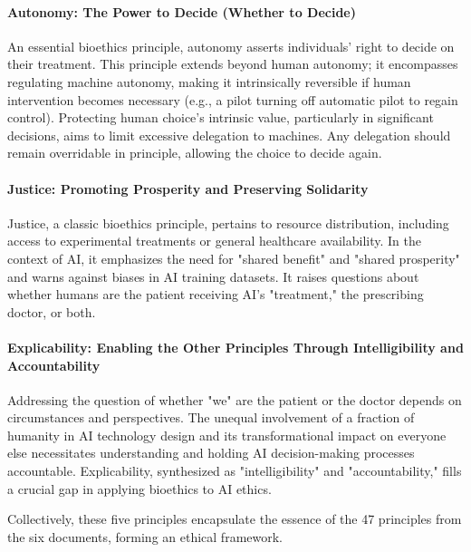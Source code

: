 \paragraph{Autonomy: The Power to Decide (Whether to Decide)}
An essential bioethics principle, autonomy asserts individuals' right to decide on their treatment. This principle extends beyond human autonomy; it encompasses regulating machine autonomy, making it intrinsically reversible if human intervention becomes necessary (e.g., a pilot turning off automatic pilot to regain control). Protecting human choice's intrinsic value, particularly in significant decisions, aims to limit excessive delegation to machines. Any delegation should remain overridable in principle, allowing the choice to decide again.

\paragraph{Justice: Promoting Prosperity and Preserving Solidarity}
Justice, a classic bioethics principle, pertains to resource distribution, including access to experimental treatments or general healthcare availability. In the context of AI, it emphasizes the need for "shared benefit" and "shared prosperity" and warns against biases in AI training datasets. It raises questions about whether humans are the patient receiving AI's "treatment," the prescribing doctor, or both.

\paragraph{Explicability: Enabling the Other Principles Through Intelligibility and Accountability}
Addressing the question of whether "we" are the patient or the doctor depends on circumstances and perspectives. The unequal involvement of a fraction of humanity in AI technology design and its transformational impact on everyone else necessitates understanding and holding AI decision-making processes accountable. Explicability, synthesized as "intelligibility" and "accountability," fills a crucial gap in applying bioethics to AI ethics. \newline

Collectively, these five principles encapsulate the essence of the 47 principles from the six documents, forming an ethical framework.

